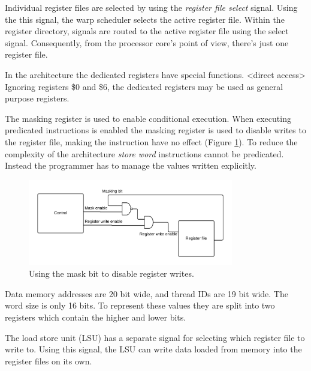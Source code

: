 Individual register files are selected by using the \emph{register file select} signal.
Using the this signal, the warp scheduler selects the active register file.
Within the register directory, signals are routed to the active register file using the select signal.
Consequently, from the processor core's point of view, there's just one register file.

In the architecture the dedicated registers have special functions.
<direct access>
Ignoring registers \$0 and \$6, the dedicated registers may be used as general purpose registers.


The masking register is used to enable conditional execution.
When executing predicated instructions is enabled the masking register is used to disable writes to the register file, making the instruction have no effect (Figure \ref{fig:masking}).
To reduce the complexity of the architecture \emph{store word} instructions cannot be predicated.
Instead the programmer has to manage the values written explicitly.
\begin{figure}[H]
	\centering
	\includegraphics[width=0.8\textwidth]{../gpu/diagrams/masking.png}
	\caption{Using the mask bit to disable register writes.}
	\label{fig:masking}
\end{figure}

Data memory addresses are 20 bit wide, and thread IDs are 19 bit wide.
The word size is only 16 bits.
To represent these values they are split into two registers which contain the higher and lower bits.

The load store unit (LSU) has a separate signal for selecting which register file to write to.
Using this signal, the LSU can write data loaded from memory into the register files on its own.
